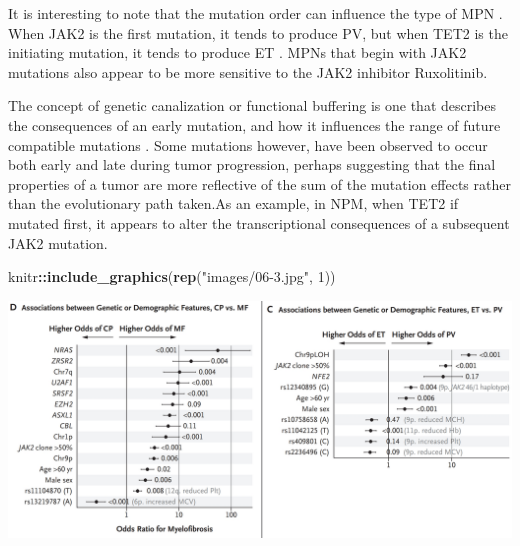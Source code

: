 \documentclass[]{book}
\newenvironment{Shaded}{\begin{snugshade}}{\end{snugshade}}
\newcommand{\DataTypeTok}[1]{\textcolor[rgb]{0.13,0.29,0.53}{#1}}
\newcommand{\DecValTok}[1]{\textcolor[rgb]{0.00,0.00,0.81}{#1}}
\newcommand{\KeywordTok}[1]{\textcolor[rgb]{0.13,0.29,0.53}{\textbf{#1}}}
\newcommand{\NormalTok}[1]{#1}
\newcommand{\OperatorTok}[1]{\textcolor[rgb]{0.81,0.36,0.00}{\textbf{#1}}}
\newcommand{\OtherTok}[1]{\textcolor[rgb]{0.56,0.35,0.01}{#1}}
\newcommand{\StringTok}[1]{\textcolor[rgb]{0.31,0.60,0.02}{#1}}
\begin{document}
\begin{Shaded}
\end{Shaded}

\citep{grinfeld2018classification}

It is interesting to note that the mutation order can influence the type of MPN \citep{ortmann2015effect, nangalia2015dnmt3a}. When JAK2 is the first mutation, it tends to produce PV, but when TET2 is the initiating mutation, it tends to produce ET \citep{ortmann2015effect}. MPNs that begin with JAK2 mutations also appear to be more sensitive to the JAK2 inhibitor Ruxolitinib.

The concept of genetic canalization or functional buffering is one that describes the consequences of an early mutation, and how it influences the range of future compatible mutations \citep{ashworth2011genetic, hartman2001principles}. Some mutations however, have been observed to occur both early and late during tumor progression, perhaps suggesting that the final properties of a tumor are more reflective of the sum of the mutation effects rather than the evolutionary path taken.As an example, in NPM, when TET2 if mutated first, it appears to alter the transcriptional consequences of a subsequent JAK2 mutation.

\begin{Shaded}
\begin{Highlighting}[]
\NormalTok{knitr}\OperatorTok{::}\KeywordTok{include_graphics}\NormalTok{(}\KeywordTok{rep}\NormalTok{(}\StringTok{"images/06-3.jpg"}\NormalTok{, }\DecValTok{1}\NormalTok{))          }
\end{Highlighting}
\end{Shaded}

\includegraphics{images/06-3.jpg}
\end{document}
